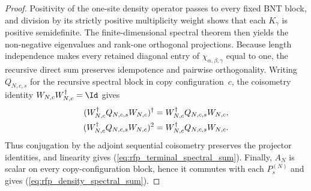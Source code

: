 \begin{proof}\leanok
    Positivity of the one-site density operator passes to every fixed BNT
    block, and division by its strictly positive multiplicity weight shows that
    each $K_\gamma$ is positive semidefinite. The finite-dimensional
    spectral theorem then yields the non-negative eigenvalues and rank-one
    orthogonal projections. Because length independence makes every retained
    diagonal entry of $\chi_{\alpha,\beta,\gamma}$ equal to one, the recursive
    direct sum preserves idempotence and pairwise orthogonality. Writing
    $Q_{N,c,s}$ for the recursive spectral block in copy
    configuration~$c$, the coisometry identity
    $W_{N,c}W_{N,c}^\dagger=\Id$ gives
    \begin{align}
        (W_{N,c}^\dagger Q_{N,c,s}W_{N,c})^\dagger
         & =W_{N,c}^\dagger Q_{N,c,s}W_{N,c},
        \notag                                \\
        (W_{N,c}^\dagger Q_{N,c,s}W_{N,c})^2
         & =W_{N,c}^\dagger Q_{N,c,s}W_{N,c}.
        \notag
    \end{align}
    Thus conjugation by the adjoint sequential coisometry preserves the
    projector identities, and linearity gives
    (\ref{eq:rfp_terminal_spectral_sum}). Finally, $A_N$ is scalar on every
    copy-configuration block, hence it commutes with each $P_s^{(N)}$ and
    gives (\ref{eq:rfp_density_spectral_sum}).
\end{proof}

